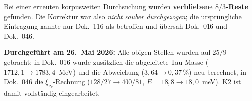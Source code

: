 Bei einer erneuten korpusweiten Durchsuchung wurden \textbf{verbliebene
$8/3$-Reste} gefunden. Die Korrektur war also \emph{nicht sauber
durchgezogen}; die ursprüngliche Eintragung nannte nur Dok.~116 als
betroffen und übersah Dok.~016 und Dok.~046.

\begin{center}
{\footnotesize
{}
} %
\end{center}

\noindent\textbf{Durchgeführt am 26.~Mai 2026:} Alle obigen Stellen
wurden auf $25/9$ gebracht; in Dok.~016 wurde zusätzlich die
abgeleitete Tau-Masse ($1712{,}1 \to 1783{,}4$~MeV) und die Abweichung
($3{,}64 \to 0{,}37\,\%$) neu berechnet, in Dok.~046 die
$\xi_{\nu_\tau}$-Rechnung ($128/27 \to 400/81$, $E = 18{,}8 \to
18{,}0$~meV). K2 ist damit vollständig eingearbeitet.

